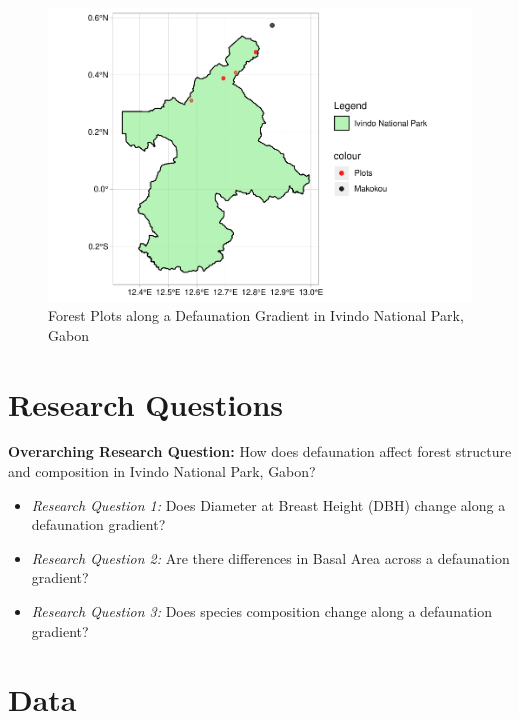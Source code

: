 \documentclass[
  12pt,
]{article}
\providecommand{\tightlist}{%
  \setlength{\itemsep}{0pt}\setlength{\parskip}{0pt}}
\begin{document}
\begin{figure}
\centering
\includegraphics{GoldenGriffithsKnierMalinowski_ENV872_Project_files/figure-latex/Map of Ivindo with plots-1.pdf}
\caption{Forest Plots along a Defaunation Gradient in Ivindo National
Park, Gabon}
\end{figure}

\newpage

\hypertarget{research-questions}{%
\section{Research Questions}\label{research-questions}}

\textbf{Overarching Research Question:} How does defaunation affect
forest structure and composition in Ivindo National Park, Gabon?

\begin{itemize}
\tightlist
\item
  \emph{Research Question 1:} Does Diameter at Breast Height (DBH)
  change along a defaunation gradient?
\item
  \emph{Research Question 2:} Are there differences in Basal Area across
  a defaunation gradient?
\item
  \emph{Research Question 3:} Does species composition change along a
  defaunation gradient?
\end{itemize}

\newpage

\hypertarget{data}{%
\section{Data}\label{data}}
\end{document}
